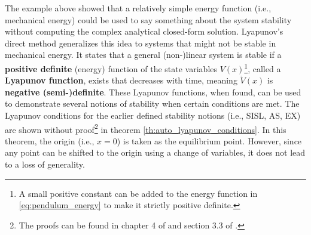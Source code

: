 The example above showed that a relatively simple energy function (i.e., mechanical energy) could be used to say something about the system stability without computing the complex analytical closed-form solution. Lyapunov's direct method generalizes this idea to systems that might not be stable in mechanical energy. It states that a general (non-)linear system is stable if a \textbf{positive definite} (energy) function of the state variables $V\left(x\right)$\footnote{A small positive constant can be added to the energy function in \ref{eq:pendulum_energy} to make it strictly positive definite.}, called a \textbf{Lyapunov function}, exists that decreases with time, meaning $\dot{V}\left(x\right)$ is \textbf{negative (semi-)definite}. These Lyapunov functions, when found, can be used to demonstrate several notions of stability when certain conditions are met. The Lyapunov conditions for the earlier defined stability notions (i.e., SISL, AS, EX) are shown without proof\footnote{The proofs can be found in chapter 4 of \cite{khalilNonlinearSystems2002} and section 3.3 of \cite{khalilNonlinearControl2015}.} in theorem \ref{th:auto_lyapunov_conditions}. In this theorem, the origin (i.e., $x = 0$) is taken as the equilibrium point. However, since any point can be shifted to the origin using a change of variables, it does not lead to a loss of generality.

